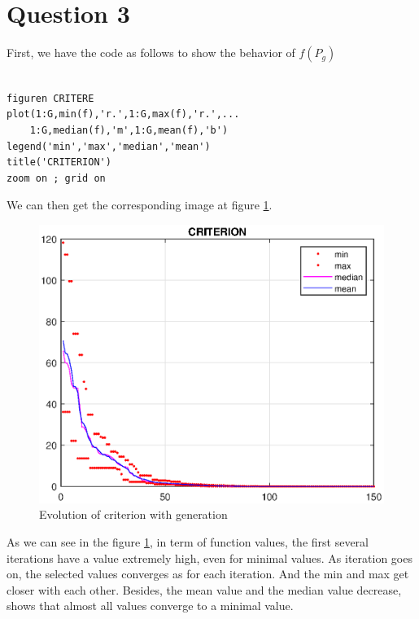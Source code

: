 \documentclass{CSArticle}[english]
\begin{document}
\section{Question 3}
First, we have the code as follows to show the behavior of $f(P_g)$
\begin{lstlisting}[style=MATLAB]
%% Behavioural analysis

figuren CRITERE
plot(1:G,min(f),'r.',1:G,max(f),'r.',...
    1:G,median(f),'m',1:G,mean(f),'b')
legend('min','max','median','mean')
title('CRITERION')
zoom on ; grid on

\end{lstlisting}
We can then get the corresponding image at figure \ref{fig:Q1_crite}.\par
\begin{figure}[h!]
\centering
\includegraphics[scale=0.7]{figure/Q1_crite.eps}
\caption{Evolution of criterion with generation}
\label{fig:Q1_crite}
\end{figure}\par
As we can see in the figure \ref{fig:Q1_crite}, in term of function values, the first several iterations have a value extremely high, even for minimal values. As iteration goes on, the selected values converges as for each iteration. And the min and max get closer with each other. Besides, the mean value and the median value decrease, shows that almost all values converge to a minimal value.
\end{document}
